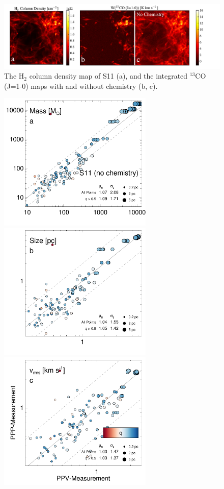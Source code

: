 \begin{figure}[htbp]
\includegraphics[width=7in]{figures/rahul_moment}
\caption{The H$_2$ column density map of S11 (a), and the integrated $^{13}$CO (J=1-0) maps with and without chemistry (b, c).}
\label{fig:rahul_moment}
\end{figure}

\begin{figure}[htbp]
\includegraphics[width=2.9in]{figures/mass_rahul_nochem_13co}\hfill
\includegraphics[width=2.9in]{figures/size_rahul_nochem_13co}
\includegraphics[width=2.9in]{figures/vel_rahul_nochem_13co}\hfill

\end{figure}
